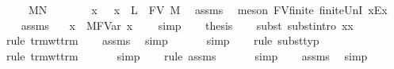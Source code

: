 \begin{isabellebody}
\ \ \ {\isachardoublequoteopen}{\isasymGamma}\ {\isasymturnstile}\ M{\isacharcircum}N\ {\isacharcolon}\ {\isasymsigma}{\isachardoublequoteclose}\isanewline
%
\isadelimproof
%
\endisadelimproof
%
\isatagproof
{}\isamarkupfalse%
\ {\isacharminus}\isanewline
\ \ \isamarkupfalse%
\ x\ \ {}{\isacharcolon}\ {\isachardoublequoteopen}x\ {\isasymnotin}\ L\ {\isasymunion}\ FV\ M{\isachardoublequoteclose}\ \isamarkupfalse%
\ assms\ \isamarkupfalse%
\ {\isacharparenleft}meson\ FV{\isacharunderscore}finite\ finite{\isacharunderscore}UnI\ x{\isacharunderscore}Ex{\isacharparenright}\isanewline
\ \ \isamarkupfalse%
\ assms\ \isamarkupfalse%
\ {}{\isacharcolon}\ {\isachardoublequoteopen}{\isacharparenleft}{\isacharparenleft}x{\isacharcomma}{\isasymtau}{\isacharparenright}{\isacharhash}{\isasymGamma}{\isacharparenright}\ {\isasymturnstile}\ M{\isacharcircum}FVar\ x\ {\isacharcolon}\ {\isasymsigma}{\isachardoublequoteclose}\ \isamarkupfalse%
\ simp\isanewline
\isanewline
\ \ \isamarkupfalse%
\ {\isacharquery}thesis\isanewline
\ \ \isamarkupfalse%
\ {\isacharparenleft}subst\ subst{\isacharunderscore}intro{}{\isacharbrackleft}\ x{\isacharequal}x{\isacharbrackright}{\isacharparenright}\isanewline
\ \ \isamarkupfalse%
\ {\isacharparenleft}rule\ trm{\isacharunderscore}wt{\isacharunderscore}trm{\isacharparenright}\isanewline
\ \ \isamarkupfalse%
\ assms\ \isamarkupfalse%
\ simp\isanewline
\ \ \isamarkupfalse%
\ {}\ \isamarkupfalse%
\ simp\isanewline
\ \ \isamarkupfalse%
\ {\isacharparenleft}rule\ subst{\isacharunderscore}typ{\isacharparenright}\isanewline
\ \ \isamarkupfalse%
\ {\isacharparenleft}rule\ trm{\isacharunderscore}wt{\isacharunderscore}trm{\isacharparenright}\isanewline
\ \ \isamarkupfalse%
\ {}\ \isamarkupfalse%
\ simp\isanewline
\ \ \isamarkupfalse%
\ {\isacharparenleft}rule\ assms{\isacharparenleft}{}{\isacharparenright}{\isacharparenright}\isanewline
\ \ \isamarkupfalse%
\ {}\ \isamarkupfalse%
\ simp\isanewline
\ \ \isamarkupfalse%
\ assms\ \isamarkupfalse%
\ simp\isanewline
{}\isamarkupfalse%
%
\endisatagproof
{\isafoldproof}%

\end{isabellebody}
